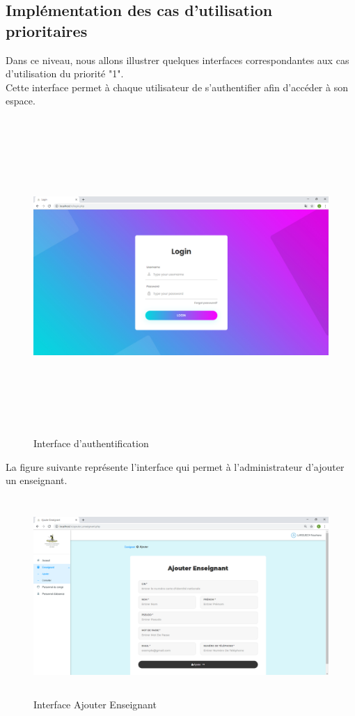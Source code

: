 \documentclass[12 pt ]{report}
\begin{document}
\subsection{Implémentation des cas d'utilisation prioritaires }
Dans ce niveau, nous allons illustrer quelques interfaces correspondantes aux cas d'utilisation du priorité "1".\\

Cette interface permet à chaque utilisateur de s’authentifier afin d’accéder à son espace.
\begin{figure}[h]
 \begin{center}
\includegraphics[width= 18 cm ,height=  12cm]{login.PNG}
\caption{Interface d'authentification}

\end{center}
\end{figure}
\newpage
La figure suivante représente l'interface qui permet à l'administrateur d'ajouter un enseignant.
\begin{figure}[h]
 \begin{center}
\includegraphics[width= 18 cm ,height=7.5cm]{ajouter_enseignant.PNG}
\caption{Interface Ajouter Enseignant}

\end{center}
\end{figure} \\
\end{document}

